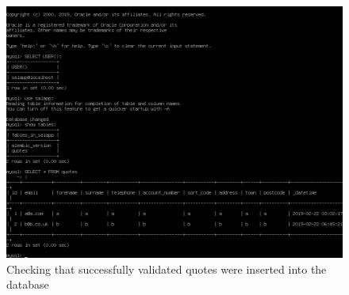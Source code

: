 \pagebreak
\begin{figure}[h!]
\centering
\captionsetup{skip=\skipfigurecaptionlen}
\includegraphics[width=1\textwidth]{screenshots/IY2D502-2019-02-22-06-50-24.png}
\caption{Checking that successfully validated quotes were inserted into the database}
\label{fig:IY2D502-2019-02-22-06-50-24}
\end{figure}

